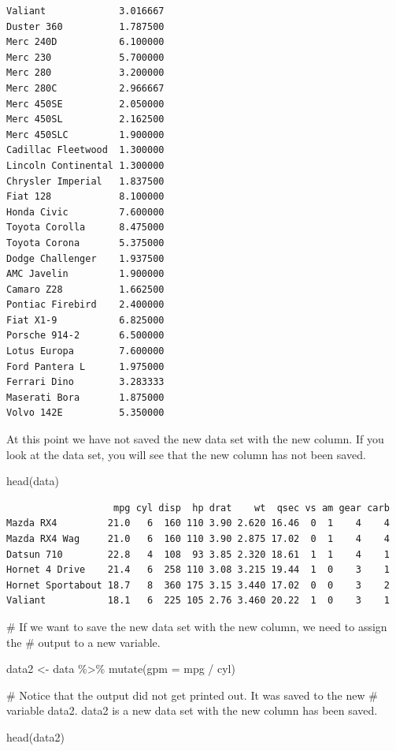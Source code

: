 \documentclass[
  letterpaper,
  DIV=11,
  numbers=noendperiod]{scrreprt}
\newenvironment{Shaded}{\begin{snugshade}}{\end{snugshade}}
\newcommand{\AttributeTok}[1]{\textcolor[rgb]{0.40,0.45,0.13}{#1}}
\newcommand{\CommentTok}[1]{\textcolor[rgb]{0.37,0.37,0.37}{#1}}
\newcommand{\FunctionTok}[1]{\textcolor[rgb]{0.28,0.35,0.67}{#1}}
\newcommand{\NormalTok}[1]{\textcolor[rgb]{0.00,0.23,0.31}{#1}}
\newcommand{\OtherTok}[1]{\textcolor[rgb]{0.00,0.23,0.31}{#1}}
\newcommand{\SpecialCharTok}[1]{\textcolor[rgb]{0.37,0.37,0.37}{#1}}
\begin{document}
\begin{verbatim}
Valiant             3.016667
Duster 360          1.787500
Merc 240D           6.100000
Merc 230            5.700000
Merc 280            3.200000
Merc 280C           2.966667
Merc 450SE          2.050000
Merc 450SL          2.162500
Merc 450SLC         1.900000
Cadillac Fleetwood  1.300000
Lincoln Continental 1.300000
Chrysler Imperial   1.837500
Fiat 128            8.100000
Honda Civic         7.600000
Toyota Corolla      8.475000
Toyota Corona       5.375000
Dodge Challenger    1.937500
AMC Javelin         1.900000
Camaro Z28          1.662500
Pontiac Firebird    2.400000
Fiat X1-9           6.825000
Porsche 914-2       6.500000
Lotus Europa        7.600000
Ford Pantera L      1.975000
Ferrari Dino        3.283333
Maserati Bora       1.875000
Volvo 142E          5.350000
\end{verbatim}

At this point we have not saved the new data set with the new column. If
you look at the data set, you will see that the new column has not been
saved.

\begin{Shaded}
\begin{Highlighting}[]
\FunctionTok{head}\NormalTok{(data)}
\end{Highlighting}
\end{Shaded}

\begin{verbatim}
                   mpg cyl disp  hp drat    wt  qsec vs am gear carb
Mazda RX4         21.0   6  160 110 3.90 2.620 16.46  0  1    4    4
Mazda RX4 Wag     21.0   6  160 110 3.90 2.875 17.02  0  1    4    4
Datsun 710        22.8   4  108  93 3.85 2.320 18.61  1  1    4    1
Hornet 4 Drive    21.4   6  258 110 3.08 3.215 19.44  1  0    3    1
Hornet Sportabout 18.7   8  360 175 3.15 3.440 17.02  0  0    3    2
Valiant           18.1   6  225 105 2.76 3.460 20.22  1  0    3    1
\end{verbatim}

\begin{Shaded}
\begin{Highlighting}[]
\CommentTok{\# If we want to save the new data set with the new column, we need to assign the}
\CommentTok{\# output to a new variable.}

\NormalTok{data2 }\OtherTok{\textless{}{-}}\NormalTok{ data }\SpecialCharTok{\%\textgreater{}\%}
  \FunctionTok{mutate}\NormalTok{(}\AttributeTok{gpm =}\NormalTok{ mpg }\SpecialCharTok{/}\NormalTok{ cyl)}

\CommentTok{\# Notice that the output did not get printed out. It was saved to the new}
\CommentTok{\# variable data2. data2 is a new data set with the new column has been saved.}

\FunctionTok{head}\NormalTok{(data2)}
\end{Highlighting}
\end{Shaded}
\end{document}
